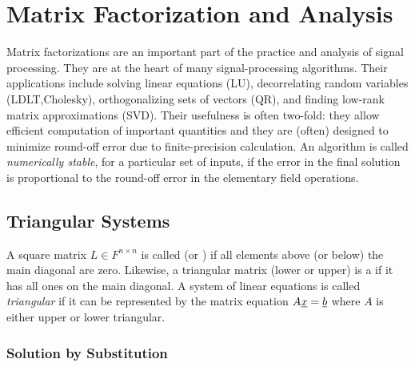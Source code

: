 \chapter{Matrix Factorization and Analysis}


Matrix factorizations are an important part of the practice and analysis of signal processing.
They are at the heart of many signal-processing algorithms. 
Their applications include solving linear equations (LU), decorrelating random variables (LDLT,Cholesky), orthogonalizing sets of vectors (QR), and finding low-rank matrix approximations (SVD).
Their usefulness is often two-fold: they allow efficient computation of important quantities and they are (often) designed to minimize round-off error due to finite-precision calculation.
An algorithm is called \emph{numerically stable}, for a particular set of inputs, if the error in the final solution is proportional to the round-off error in the elementary field operations.

\section{Triangular Systems}

A square matrix $L \in F^{n \times n}$ is called  (or ) if all elements above (or below) the main diagonal are zero.
Likewise, a triangular matrix (lower or upper) is a  if it has all ones on the main diagonal.
A system of linear equations is called \emph{triangular} if it can be represented by the matrix equation $A \underline{x} = \underline{b}$ where $A$ is either upper or lower triangular.

\subsection{Solution by Substitution}

